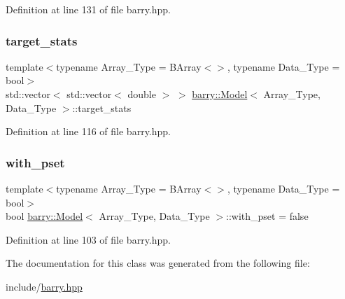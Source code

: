 Definition at line 131 of file barry.\+hpp.

\mbox{\label{classbarry_1_1_model_a68a8443e506fb8d3f1800f42689d8ec5}} 
\subsubsection{\texorpdfstring{target\+\_\+stats}{target\_stats}}
{\footnotesize\ttfamily template$<$typename Array\+\_\+\+Type  = B\+Array$<$$>$, typename Data\+\_\+\+Type  = bool$>$ \\
std\+::vector$<$ std\+::vector$<$ double $>$ $>$ \hyperlink{classbarry_1_1_model}{barry\+::\+Model}$<$ Array\+\_\+\+Type, Data\+\_\+\+Type $>$\+::target\+\_\+stats}



Definition at line 116 of file barry.\+hpp.

\mbox{\label{classbarry_1_1_model_ac150584eb79bb1ff9a109dc1f1d5f8ab}} 
\subsubsection{\texorpdfstring{with\+\_\+pset}{with\_pset}}
{\footnotesize\ttfamily template$<$typename Array\+\_\+\+Type  = B\+Array$<$$>$, typename Data\+\_\+\+Type  = bool$>$ \\
bool \hyperlink{classbarry_1_1_model}{barry\+::\+Model}$<$ Array\+\_\+\+Type, Data\+\_\+\+Type $>$\+::with\+\_\+pset = false}



Definition at line 103 of file barry.\+hpp.



The documentation for this class was generated from the following file\+:\begin{DoxyCompactItemize}
\item 
include/\hyperlink{barry_8hpp}{barry.\+hpp}\end{DoxyCompactItemize}
